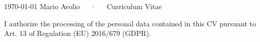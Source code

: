 \documentclass[11pt, a4paper]{awesome-cv}
\begin{document}
\makecvheader

\makecvfooter
  {\today}
  {Mario Avolio~~~·~~~Curriculum Vitae}
  {\thepage}







% 
% 
% 
% 
% 
% 

\vspace{2mm}
\begin{center}
  {\fontsize{7.5pt}{1em}\bodyfontlight\color{graytext} I authorize the processing of the personal data contained in this CV pursuant to Art. 13 of Regulation (EU) 2016/679 (GDPR).}
\end{center}


\end{document}
